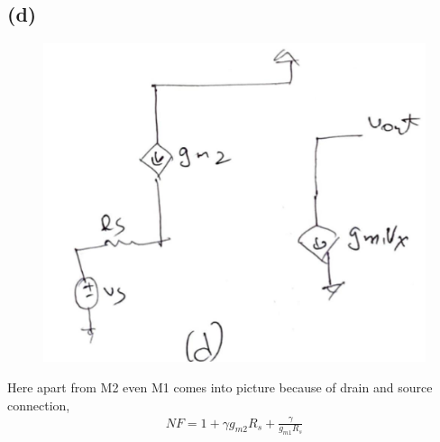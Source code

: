 \documentclass{article}
\begin{document}
\subsection*{(d)}
\begin{figure}[H]
	\centering
	\includegraphics[scale=0.25]{./figs/q6d.jpeg}
\end{figure}
Here apart from M2 even M1 comes into picture because of drain and source connection,
\begin{gather*}
	NF = 1 + \gamma g_{m2}R_s + \frac{\gamma}{g_{m1}R_s}
\end{gather*}
\end{document}
